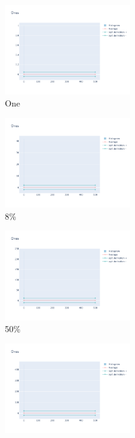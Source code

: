 \documentclass[12pt, fleqn]{report}                             %
\theoremstyle{break}                                            %
\begin{document}
      \begin{figure}[ht!]
        \centering
        \begin{subfigure}[b]{0.4\linewidth}
          \includegraphics[width=0.6\textwidth]{Images/8/dia-a.png}
          \caption{One}
        \end{subfigure}
        \begin{subfigure}[b]{0.4\linewidth}
          \includegraphics[width=0.6\textwidth]{Images/8/dia-b.png}
          \caption{8\%}
        \end{subfigure}
        \begin{subfigure}[b]{0.4\linewidth}
          \includegraphics[width=0.6\textwidth]{Images/8/dia-c.png}
          \caption{50\%}
        \end{subfigure}
        \begin{subfigure}[b]{0.4\linewidth}
          \includegraphics[width=0.6\textwidth]{Images/8/dia-d.png}

\end{subfigure}
\end{figure}
\end{document}
